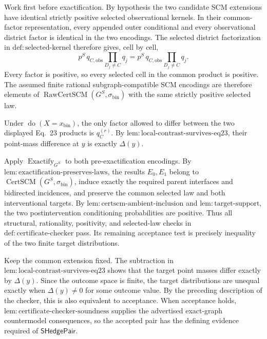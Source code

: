 {%
Work first before exactification.  By hypothesis the two candidate SCM extensions have identical strictly positive selected observational kernels.  In their common-factor representation, every appended outer conditional and every observational district factor is identical in the two encodings.  The selected district factorization in \(\mathrm{def:selected\text{-}kernel}\) therefore gives, cell by cell,
\[
 p^S\,q_{C,\mathrm{obs}}\prod_{D_j\ne C}q_j
 =p^S\,q_{C,\mathrm{obs}}\prod_{D_j\ne C}q_j.
\]
Every factor is positive, so every selected cell in the common product is positive.  The assumed finite rational subgraph-compatible SCM encodings are therefore elements of \(\operatorname{RawCertSCM}(G^S,\sigma_{\mathrm{bin}})\) with the same strictly positive selected law.

Under \(\operatorname{do}(X=x_{\mathrm{bin}})\), the only factor allowed to differ between the two displayed Eq.\ 23 products is \(q_C^{(r)}\).  By \(\mathrm{lem:local\text{-}contrast\text{-}survives\text{-}eq23}\), their point-mass difference at \(y\) is exactly \(\Delta(y)\).

Apply \(\operatorname{Exactify}_{G^S}\) to both pre-exactification encodings.  By \(\mathrm{lem:exactification\text{-}preserves\text{-}laws}\), the results \(E_0,E_1\) belong to \(\operatorname{CertSCM}(G^S,\sigma_{\mathrm{bin}})\), induce exactly the required parent interfaces and bidirected incidences, and preserve the common selected law and both interventional targets.  By \(\mathrm{lem:certscm\text{-}ambient\text{-}inclusion}\) and \(\mathrm{lem:target\text{-}support}\), the two postintervention conditioning probabilities are positive.  Thus all structural, rationality, positivity, and selected-law checks in \(\mathrm{def:certificate\text{-}checker}\) pass.  Its remaining acceptance test is precisely inequality of the two finite target distributions.

Keep the common extension fixed.  The subtraction in \(\mathrm{lem:local\text{-}contrast\text{-}survives\text{-}eq23}\) shows that the target point masses differ exactly by \(\Delta(y)\).  Since the outcome space is finite, the target distributions are unequal exactly when \(\Delta(y)\ne0\) for some outcome value.  By the preceding description of the checker, this is also equivalent to acceptance.  When acceptance holds, \(\mathrm{lem:certificate\text{-}checker\text{-}soundness}\) supplies the advertised exact-graph countermodel consequences, so the accepted pair has the defining evidence required of \(\mathsf{SHedgePair}\).

}
